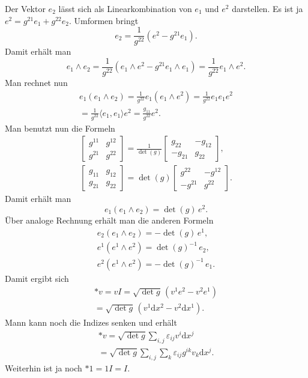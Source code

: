 \documentclass[a4paper,10pt,fleqn,twocolumn,twoside]{article}
\begin{document}
Der Vektor \(e_2\) lässt sich als Linearkombination von \(e_1\)
und \(e^2\) darstellen. Es ist ja \(e^2=g^{21}e_1+g^{22}e_2\).
Umformen bringt
\[e_2 = \frac{1}{g^{22}}(e^2-g^{21}e_1).\]
Damit erhält man
\[e_1\wedge e_2
= \frac{1}{g^{22}}(e_1\wedge e^2-g^{21}e_1\wedge e_1)
= \frac{1}{g^{22}}e_1\wedge e^2.\]
Man rechnet nun
\begin{gather*}
e_1(e_1\wedge e_2) = \frac{1}{g^{22}}e_1(e_1\wedge e^2)
= \frac{1}{g^{22}}e_1e_1e^2\\
= \frac{1}{g^{22}}\langle e_1,e_1\rangle e^2
= \frac{g_{11}}{g^{22}}e^2.
\end{gather*}
Man benutzt nun die Formeln
\begin{gather*}
\begin{bmatrix}
g^{11} & g^{12}\\
g^{21} & g^{22}
\end{bmatrix}
= \frac{1}{\det(g)}
\begin{bmatrix}
g_{22} & -g_{12}\\
-g_{21} & g_{22}
\end{bmatrix},\\
\begin{bmatrix}
g_{11} & g_{12}\\
g_{21} & g_{22}
\end{bmatrix}
= \det(g)
\begin{bmatrix}
g^{22} & -g^{12}\\
-g^{21} & g^{22}
\end{bmatrix}.
\end{gather*}
Damit erhält man
\[e_1(e_1\wedge e_2) = \det(g)\,e^2.\]
Über analoge Rechnung erhält man die anderen Formeln
\begin{gather*}
e_2(e_1\wedge e_2) = -\det(g)\,e^1,\\
e^1(e^1\wedge e^2) = \det(g)^{-1}\,e_2,\\
e^2(e^1\wedge e^2) = -\det(g)^{-1}\,e_1.
\end{gather*}
Damit ergibt sich
\begin{gather*}
*v = vI = \sqrt{\det g}\,(v^1 e^2 - v^2 e^1)\\
= \sqrt{\det g}\,(v^1 \mathrm dx^2 - v^2 \mathrm dx^1).
\end{gather*}
Mann kann noch die Indizes senken und erhält
\begin{gather*}
*v = \sqrt{\det g}\sum_{i,j}\varepsilon_{ij}v^i \mathrm dx^j\\
= \sqrt{\det g}\sum_{i,j}
\sum_{k}\varepsilon_{ij}g^{ik}v_k \mathrm dx^j.
\end{gather*}
Weiterhin ist ja noch \(*1 = 1I=I\).
\end{document}
